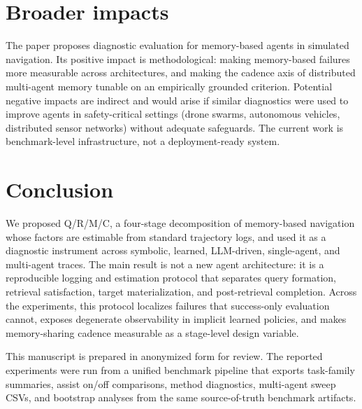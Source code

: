 \documentclass{article}
\begin{document}
\section{Broader impacts}

The paper proposes diagnostic evaluation for memory-based agents in simulated navigation. Its positive impact is methodological: making memory-based failures more measurable across architectures, and making the cadence axis of distributed multi-agent memory tunable on an empirically grounded criterion. Potential negative impacts are indirect and would arise if similar diagnostics were used to improve agents in safety-critical settings (drone swarms, autonomous vehicles, distributed sensor networks) without adequate safeguards. The current work is benchmark-level infrastructure, not a deployment-ready system.

\section{Conclusion}

We proposed Q/R/M/C, a four-stage decomposition of memory-based
navigation whose factors are estimable from standard trajectory logs,
and used it as a diagnostic instrument across symbolic, learned,
LLM-driven, single-agent, and multi-agent traces. The main result is
not a new agent architecture: it is a reproducible logging and
estimation protocol that separates query formation, retrieval
satisfaction, target materialization, and post-retrieval completion.
Across the experiments, this protocol localizes failures that
success-only evaluation cannot, exposes degenerate observability in
implicit learned policies, and makes memory-sharing cadence measurable
as a stage-level design variable.

\begin{ack}
This manuscript is prepared in anonymized form for review. The
reported experiments were run from a unified benchmark pipeline that
exports task-family summaries, assist on/off comparisons, method
diagnostics, multi-agent sweep CSVs, and bootstrap analyses from the
same source-of-truth benchmark artifacts.
\end{ack}
\end{document}
